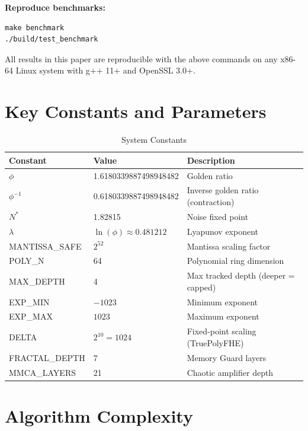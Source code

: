 \documentclass[11pt,a4paper]{article}
\begin{document}
\textbf{Reproduce benchmarks:}
\begin{verbatim}
make benchmark
./build/test_benchmark
\end{verbatim}

All results in this paper are reproducible with the above commands on any x86-64 Linux system with g++ 11+ and OpenSSL 3.0+.

\section{Key Constants and Parameters}

\begin{table}[H]
\centering
\caption{System Constants}
\label{tab:constants}
\begin{tabular}{@{}lll@{}}
\toprule
\textbf{Constant} & \textbf{Value} & \textbf{Description} \\
\midrule
$\phi$ & 1.6180339887498948482 & Golden ratio \\
$\phi^{-1}$ & 0.6180339887498948482 & Inverse golden ratio (contraction) \\
$N^*$ & 1.82815 & Noise fixed point \\
$\lambda$ & $\ln(\phi) \approx 0.481212$ & Lyapunov exponent \\
MANTISSA\_SAFE & $2^{52}$ & Mantissa scaling factor \\
POLY\_N & 64 & Polynomial ring dimension \\
MAX\_DEPTH & 4 & Max tracked depth (deeper = capped) \\
EXP\_MIN & $-1023$ & Minimum exponent \\
EXP\_MAX & $1023$ & Maximum exponent \\
DELTA & $2^{10} = 1024$ & Fixed-point scaling (TruePolyFHE) \\
FRACTAL\_DEPTH & 7 & Memory Guard layers \\
MMCA\_LAYERS & 21 & Chaotic amplifier depth \\
\bottomrule
\end{tabular}
\end{table}

\section{Algorithm Complexity}
\end{document}
